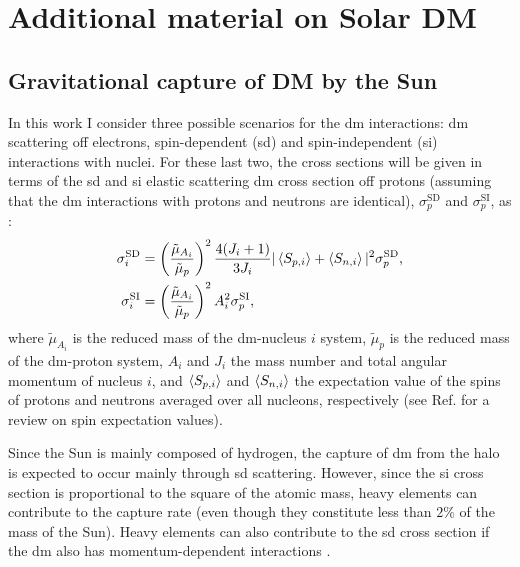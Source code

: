 \chapter{Additional material on Solar DM}

\section{Gravitational capture of DM by the Sun}
\label{sec:dm_analysis_capture_rates}

In this work I consider three possible scenarios for the \gls{dm} interactions: \gls{dm} scattering off electrons, spin-dependent (\gls{sd}) and spin-independent (\gls{si}) interactions with nuclei. For these last two, the cross sections will be given in terms of the \gls{sd} and \gls{si} elastic scattering \gls{dm} cross section off protons (assuming that the \gls{dm} interactions with protons and neutrons are identical), $\sigma_{p}^{\mathrm{SD}}$ and $\sigma_{p}^{\mathrm{SI}}$, as \cite{Bernal2012,Palomares2017}:
\begin{align}\label{2.3-2.4}
	\sigma_{i}^{\mathrm{SD}} &= \left(\frac{\tilde{\mu}_{A_{i}}}{\tilde{\mu}_{p}}\right)^{2} \frac{4(J_{i}+1)}{3 J_{i}} |\expval{S_{p,i}} + \expval{S_{n,i}}|^{2} \sigma_{p}^{\mathrm{SD}},\\
	\sigma_{i}^{\mathrm{SI}} &= \left(\frac{\tilde{\mu}_{A_{i}}}{\tilde{\mu}_{p}}\right)^{2} A_{i}^{2} \sigma_{p}^{\mathrm{SI}},
\end{align}
where $\tilde{\mu}_{A_{i}}$ is the reduced mass of the \gls{dm}-nucleus $i$ system, $\tilde{\mu}_{p}$ is the reduced mass of the \gls{dm}-proton system, $A_{i}$ and $J_{i}$ the mass number and total angular momentum of nucleus $i$, and $\expval{S_{p,i}}$ and $\expval{S_{n,i}}$ the expectation value of the spins of protons and neutrons averaged over all nucleons, respectively (see Ref. \cite{Bednyakov2004} for a review on spin expectation values).

Since the Sun is mainly composed of hydrogen, the capture of \gls{dm} from the halo is expected to occur mainly through \gls{sd} scattering. However, since the \gls{si} cross section is proportional to the square of the atomic mass, heavy elements can contribute to the capture rate (even though they constitute less than $2\%$ of the mass of the Sun). Heavy elements can also contribute to the \gls{sd} cross section if the \gls{dm} also has momentum-dependent interactions \cite{Catena2015}.

